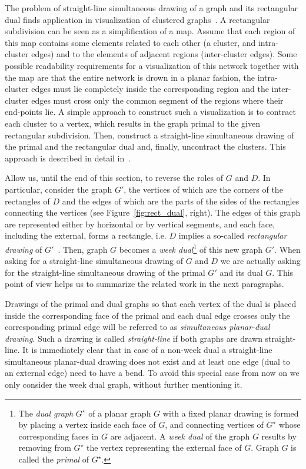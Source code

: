 \documentclass{llncs}
\begin{document}
The problem of straight-line simultaneous drawing of a graph and its rectangular dual finds application in visualization of clustered graphs~\cite{AlamKKM14,HuGK10}. A rectangular subdivision can be seen as a simplification of a map. Assume that each region of this map contains some elements related to each other (a cluster, and intra-cluster edges) and to  the elements of adjacent regions (inter-cluster edges). Some possible readability requirements for a visualization of this network together with the map are that the entire network is drown in a planar fashion, the intra-cluster edges must lie completely inside the corresponding region and the inter-cluster edges must cross only the common segment of the regions where their end-points lie.   A simple approach to construct such a visualization is to contract each cluster to a vertex, which results in the graph primal to the given rectangular subdivision. Then, construct a straight-line simultaneous drawing of the primal and the rectangular dual and, finally, uncontract the clusters. This approach is described in detail in~\cite[Theorem~2]{AlamKKM14}.   

Allow us, until the end of this section, to reverse the roles of $G$ and $D$. In particular, consider the graph $G'$, the vertices of which are the corners of the rectangles of $D$ and the edges of which are the parts of the sides of the rectangles connecting the vertices (see Figure~\ref{fig:rect_dual}, right). The edges of this graph are represented either by horizontal or by vertical segments, and each face, including the external, forms a rectangle, i.e. $D$ implies  a so-called \emph{rectangular drawing} of $G'$~\cite{gdhandbook13rect}.  Then, graph $G$ becomes a \emph{week dual}\footnote{The  \emph{dual graph} $G^\star$ of a planar graph $G$ with a fixed planar drawing is formed by placing a vertex inside each face of $G$, and connecting  vertices of $G^\star$ whose corresponding faces in $G$ are adjacent. A \emph{week dual} of the graph $G$ results 
by removing from $G^\star$ the vertex representing the external face of $G$.
Graph $G$ is  called the \emph{primal} of $G^\star$.
} of this new graph $G'$. 
When asking for a straight-line simultaneous drawing of $G$ and $D$ we are actually asking for the  straight-line simultaneous drawing of the primal $G'$ and its dual $G$. This point of view helps us to summarize the related work in the next paragraphs. 

Drawings of the primal and dual graphs so that each vertex of the dual is placed inside the corresponding face of the primal and each dual edge crosses only the corresponding primal edge will be referred to as  \emph{simultaneous planar-dual drawing}. Such a drawing is called \emph{straight-line} if both graphs are drawn straight-line.  It is immediately clear that in case of a non-week dual   a straight-line simultaneous planar-dual drawing does not exist and at least one edge (dual to an external edge)  need to have a bend. To avoid this special case from now on we only consider the week dual graph, without further mentioning  it. 
\end{document}
